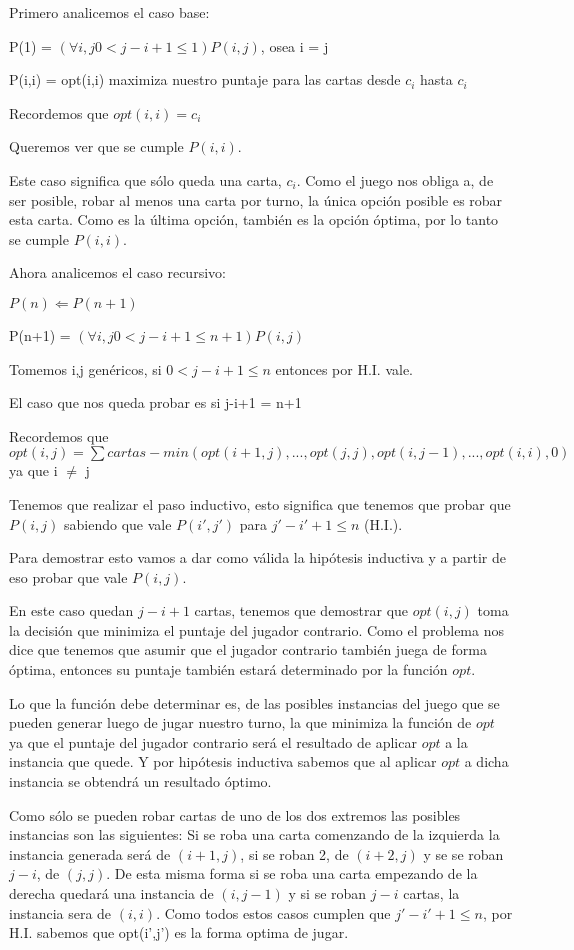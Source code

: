 Primero analicemos el caso base:

P(1) = $(\forall i,j 0 < j -i + 1 \leq 1) P(i,j)$, osea i = j

P(i,i) = opt(i,i) maximiza nuestro puntaje para las cartas desde $c_i$ hasta $c_i$

Recordemos que $opt(i,i) = c_i$

Queremos ver que se cumple $P(i,i)$.

Este caso significa que sólo queda una carta, $c_i$. Como el juego nos obliga a, de ser posible, robar al menos una carta por turno, la única opción posible es robar esta carta. Como es la última opción, también es la opción óptima, por lo tanto se cumple $P(i,i)$.

Ahora analicemos el caso recursivo:

$ P(n) \Leftarrow P(n+1)$

P(n+1) = $(\forall i,j 0 < j -i + 1 \leq n+1) P(i,j)$

Tomemos i,j genéricos, si $0 < j-i+1 \leq n$ entonces por H.I. vale.

El caso que nos queda probar es si j-i+1 = n+1

Recordemos que $opt(i,j) = \sum cartas - min(opt(i+1, j), ..., opt(j,j), opt(i, j-1), ... ,opt(i,i), 0)$ ya que i $\neq$ j

Tenemos que realizar el paso inductivo, esto significa que tenemos que probar que $P(i,j)$ sabiendo que vale $P(i',j')$ para $j' - i' + 1 \leq n$ (H.I.).

Para demostrar esto vamos a dar como válida la hipótesis inductiva y a partir de eso probar que vale $P(i,j)$.

En este caso quedan $j-i+1$ cartas, tenemos que demostrar que $opt(i,j)$ toma la decisión que minimiza el puntaje del jugador contrario. Como el problema nos dice que tenemos que asumir que el jugador contrario también juega de forma óptima, entonces su puntaje también estará determinado por la función $opt$.

Lo que la función debe determinar es, de las posibles instancias del juego que se pueden generar luego de jugar nuestro turno, la que minimiza la función de $opt$ ya que el puntaje del jugador contrario será el resultado de aplicar $opt$ a la instancia que quede. Y por hipótesis inductiva sabemos que al aplicar $opt$ a dicha instancia se obtendrá un resultado óptimo.

Como sólo se pueden robar cartas de uno de los dos extremos las posibles instancias son las siguientes: Si se roba una carta comenzando de la izquierda la instancia generada será de $(i+1,j)$, si se roban 2, de $(i+2,j)$ y se se roban $j-i$, de $(j,j)$. De esta misma forma si se roba una carta empezando de la derecha quedará una instancia de $(i,j-1)$ y si se roban $j-i$ cartas, la instancia sera de $(i,i)$. Como todos estos casos cumplen que $j' - i' + 1 \leq n$, por H.I. sabemos que opt(i',j') es la forma optima de jugar.

